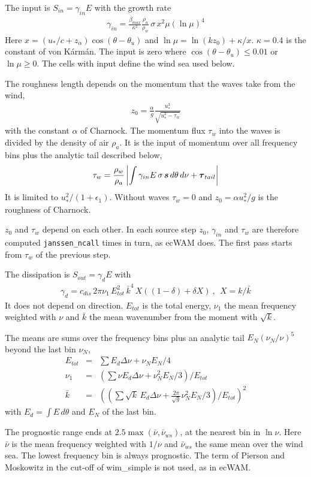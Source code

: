 \documentclass[12pt]{article}
\newcommand{\beq}  { \begin{eqnarray} }
\newcommand{\eeq}  { \end{eqnarray}}
\newcommand{\beeq}  { \begin{eqnarray*} }
\newcommand{\eeeq}  { \end{eqnarray*}}
\renewcommand{\v}[1]{{\mbox{\boldmath$ #1 $}}}  %
\newcommand{\lk}{\left(}
\newcommand{\rk}{\right)}
\begin{document}
The input is $S_{in} = \gamma_{in} E$ with the growth rate
\beq
 \gamma_{in} = \frac{\beta_{max}}{\kappa^2} \frac{\rho_a}{\rho_w}\, \sigma\, x^2 \mu \lk \ln \mu \rk^4
\eeq
Here $x = (u_*/c + z_\alpha) \cos(\theta - \theta_u)$ and $\ln \mu = \ln(k z_0) + \kappa / x$.
$\kappa = 0.4$ is the constant of von K\'arm\'an.
The input is zero where $\cos(\theta - \theta_u) \le 0.01$ or $\ln \mu \ge 0$.
The cells with input define the wind sea used below.

The roughness length depends on the momentum that the waves take from the wind,
\beq
 z_0 = \frac{\alpha}{g} \frac{u_*^3}{\sqrt{u_*^2 - \tau_w}}
\eeq
with the constant $\alpha$ of Charnock.
The momentum flux $\tau_w$ into the waves is divided by the density of air $\rho_a$.
It is the input of momentum over all frequency bins plus the analytic tail described below,
\beeq
 \tau_w = \frac{\rho_w}{\rho_a} \left| \int \gamma_{in} E\, \sigma\, \v s\, d\theta\, d\nu + \v \tau_{tail} \right|
\eeeq
It is limited to $u_*^2/(1+\epsilon_1)$.
Without waves $\tau_w = 0$ and $z_0 = \alpha u_*^2/g$ is the roughness of Charnock.

$z_0$ and $\tau_w$ depend on each other.
In each source step $z_0$, $\gamma_{in}$ and $\tau_w$ are therefore computed \verb|janssen_ncall| times in turn, as ecWAM does.
The first pass starts from $\tau_w$ of the previous step.

The dissipation is $S_{out} = \gamma_d E$ with
\beq
 \gamma_d = c_{dis}\, 2 \pi \nu_1\, E_{tot}^2\, \bar k^4\, X \lk (1-\delta) + \delta X \rk ~,~~ X = k/\bar k
\eeq
It does not depend on direction.
$E_{tot}$ is the total energy, $\nu_1$ the mean frequency weighted with $\nu$ and $\bar k$ the mean wavenumber from the moment with $\sqrt k$.

The means are sums over the frequency bins plus an analytic tail $E_N (\nu_N/\nu)^5$ beyond the last bin $\nu_N$,
\beeq
 E_{tot} &=& \sum E_d \Delta \nu + \nu_N E_N /4 \\
 \nu_1 &=& \lk \sum \nu E_d \Delta \nu + \nu_N^2 E_N/3 \rk / E_{tot} \\
 \bar k &=& \lk \lk \sum \sqrt{k}\, E_d \Delta \nu + \frac{2 \pi}{\sqrt g} \nu_N^2 E_N/3 \rk / E_{tot} \rk^2
\eeeq
with $E_d = \int E\, d\theta$ and $E_N$ of the last bin.

The prognostic range ends at $2.5 \max(\bar \nu, \bar \nu_{ws})$, at the nearest bin in $\ln \nu$.
Here $\bar \nu$ is the mean frequency weighted with $1/\nu$ and $\bar \nu_{ws}$ the same mean over the wind sea.
The lowest frequency bin is always prognostic.
The term of Pierson and Moskowitz in the cut-off of wim\_simple is not used, as in ecWAM.
\end{document}
